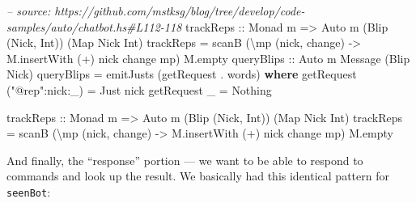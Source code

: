 \documentclass[]{article}
\newenvironment{Shaded}{}{}
\newcommand{\KeywordTok}[1]{\textcolor[rgb]{0.00,0.44,0.13}{\textbf{{#1}}}}
\newcommand{\DataTypeTok}[1]{\textcolor[rgb]{0.56,0.13,0.00}{{#1}}}
\newcommand{\StringTok}[1]{\textcolor[rgb]{0.25,0.44,0.63}{{#1}}}
\newcommand{\CommentTok}[1]{\textcolor[rgb]{0.38,0.63,0.69}{\textit{{#1}}}}
\newcommand{\OtherTok}[1]{\textcolor[rgb]{0.00,0.44,0.13}{{#1}}}
\newcommand{\FunctionTok}[1]{\textcolor[rgb]{0.02,0.16,0.49}{{#1}}}
\newcommand{\NormalTok}[1]{{#1}}
\begin{document}
\begin{Shaded}
\begin{Highlighting}[]
\CommentTok{-- source: https://github.com/mstksg/blog/tree/develop/code-samples/auto/chatbot.hs#L112-118}
\OtherTok{    trackReps ::} \DataTypeTok{Monad} \NormalTok{m }\OtherTok{=>} \DataTypeTok{Auto} \NormalTok{m (}\DataTypeTok{Blip} \NormalTok{(}\DataTypeTok{Nick}\NormalTok{, }\DataTypeTok{Int}\NormalTok{)) (}\DataTypeTok{Map} \DataTypeTok{Nick} \DataTypeTok{Int}\NormalTok{)}
    \NormalTok{trackReps }\FunctionTok{=} \NormalTok{scanB (\textbackslash{}mp (nick, change) }\OtherTok{->} \NormalTok{M.insertWith (}\FunctionTok{+}\NormalTok{) nick change mp) M.empty}
\OtherTok{    queryBlips ::} \DataTypeTok{Auto} \NormalTok{m }\DataTypeTok{Message} \NormalTok{(}\DataTypeTok{Blip} \DataTypeTok{Nick}\NormalTok{)}
    \NormalTok{queryBlips }\FunctionTok{=} \NormalTok{emitJusts (getRequest }\FunctionTok{.} \NormalTok{words)}
      \KeywordTok{where}
        \NormalTok{getRequest (}\StringTok{"@rep"}\FunctionTok{:}\NormalTok{nick}\FunctionTok{:}\NormalTok{_) }\FunctionTok{=} \DataTypeTok{Just} \NormalTok{nick}
        \NormalTok{getRequest _                }\FunctionTok{=} \DataTypeTok{Nothing}



\OtherTok{trackReps ::} \DataTypeTok{Monad} \NormalTok{m }\OtherTok{=>} \DataTypeTok{Auto} \NormalTok{m (}\DataTypeTok{Blip} \NormalTok{(}\DataTypeTok{Nick}\NormalTok{, }\DataTypeTok{Int}\NormalTok{)) (}\DataTypeTok{Map} \DataTypeTok{Nick} \DataTypeTok{Int}\NormalTok{)}
\NormalTok{trackReps }\FunctionTok{=} \NormalTok{scanB (\textbackslash{}mp (nick, change) }\OtherTok{->} \NormalTok{M.insertWith (}\FunctionTok{+}\NormalTok{) nick change mp) M.empty}
\end{Highlighting}
\end{Shaded}

And finally, the ``response'' portion --- we want to be able to respond to commands and look up the
result. We basically had this identical pattern for \texttt{seenBot}:
\end{document}
